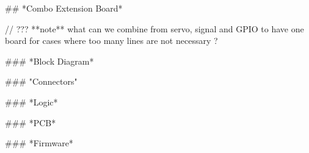 ## *Combo Extension Board*

// ??? **note** what can we combine from servo, signal and GPIO to have one board for cases where too many lines are not necessary ?

### *Block Diagram*

### "Connectors"

### *Logic*

### *PCB*

### *Firmware*